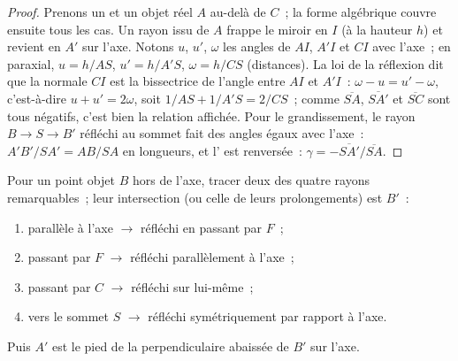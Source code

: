 \begin{proof}
Prenons un  et un objet réel $A$ au-delà de $C$~; la forme
algébrique couvre ensuite tous les cas. Un rayon issu de $A$ frappe le
miroir en $I$ (à la hauteur $h$) et revient en $A'$ sur l'axe. Notons
$u$, $u'$, $\omega$ les angles de $AI$, $A'I$ et $CI$ avec l'axe~; en
paraxial, $u = h/AS$, $u' = h/A'S$, $\omega = h/CS$ (distances). La loi
de la réflexion dit que la normale $CI$ est la bissectrice de l'angle
entre $AI$ et $A'I$~: $\omega - u = u' - \omega$, c'est-à-dire
$u + u' = 2\omega$, soit
$1/AS + 1/A'S = 2/CS$~; comme $\overline{SA}$, $\overline{SA'}$ et
$\overline{SC}$ sont tous négatifs, c'est bien la relation affichée.
Pour le grandissement, le rayon $B \to S \to B'$ réfléchi au sommet fait
des angles égaux avec l'axe~: $A'B'/SA' = AB/SA$ en longueurs, et
l' est renversée~: $\gamma = -\overline{SA'}/\overline{SA}$.
\end{proof}

\begin{method}\label{met:b1:mirrors-thin-lenses:mirrorrays}
Pour un point objet $B$ hors de l'axe, tracer deux des quatre rayons
remarquables~; leur intersection (ou celle de leurs prolongements) est $B'$~:
\begin{enumerate}
  \item parallèle à l'axe $\to$ réfléchi en passant par $F$~;
  \item passant par $F$ $\to$ réfléchi parallèlement à l'axe~;
  \item passant par $C$ $\to$ réfléchi sur lui-même~;
  \item vers le sommet $S$ $\to$ réfléchi symétriquement par rapport à l'axe.
\end{enumerate}
Puis $A'$ est le pied de la perpendiculaire abaissée de $B'$ sur l'axe.
\end{method}

